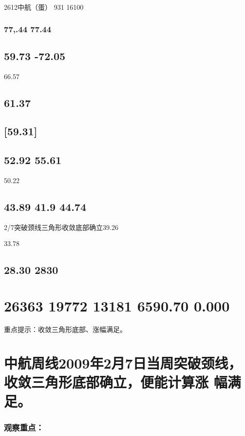 \documentclass{article}
\begin{document}
2612中航（蛋） 931 16100

\subsubsection{77,.44 77.44}

\subsection{59.73 -72.05}

66.57

\subsection{61.37}

\subsection{[59.31]}

\subsection{52.92 55.61}

50.22

\subsection{43.89 41.9 44.74}

2/7突破颈线三角形收敛底部确立39.26

33.78

\subsection{28.30 2830}

\section{26363 19772 13181 6590.70 0.000}

重点提示：收敛三角形底部、涨幅满足。

\section{中航周线2009年2月7日当周突破颈线，收敛三角形底部确立，便能计算涨 幅满足。}

\subsubsection{观察重点：}
\end{document}

